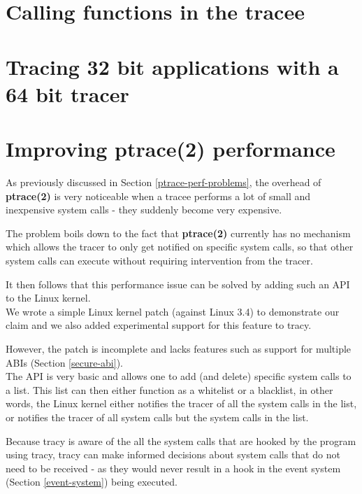 \documentclass[a4paper, 10pt]{report}
\begin{document}
\section{Calling functions in the tracee}

\section{Tracing 32 bit applications with a 64 bit tracer}

\section{Improving ptrace(2) performance}
\label{ptrace-perf}

As previously discussed in Section \ref{ptrace-perf-problems}, the overhead
of \textbf{ptrace(2)} is very noticeable when a tracee performs a lot of
small and inexpensive system calls - they suddenly become very expensive.

The problem boils down to the fact that \textbf{ptrace(2)} currently
has no mechanism which allows the tracer to only get notified on specific
system calls, so that other system calls can execute without requiring
intervention from the tracer.

It then follows that this performance
issue can be solved by adding such an API to the Linux kernel. \\

We wrote a simple Linux kernel patch (against Linux 3.4) to demonstrate
our claim and we also added experimental support for this feature to tracy.

However, the patch is incomplete and lacks features such as support for
multiple ABIs (Section \ref{secure-abi}). \\

The API is very basic and allows one to add (and delete) specific system
calls to a list. This list can then either function as a whitelist or a
blacklist, in other words, the Linux kernel either notifies the tracer of
all the system calls in the list, or notifies the tracer of all system calls
but the system calls in the list.


Because tracy is aware of the all the system calls that are hooked by the
program using tracy, tracy can make informed decisions about system calls
that do not need to be received - as they would never result in a hook in
the event system (Section \ref{event-system}) being executed.
\end{document}
